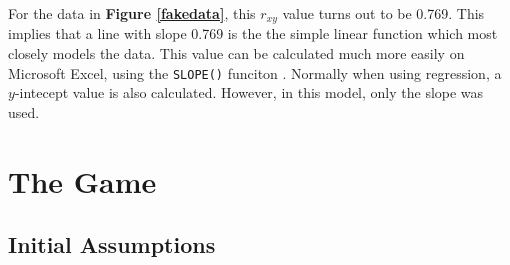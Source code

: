 \documentclass[11pt]{article}
\begin{document}
For the data in \textbf{Figure \ref{fakedata}}, this $r_{xy}$ value
turns out to be 0.769. This implies that a line with slope 0.769 is the
the simple linear function which most closely models the data. This
value can be calculated much more easily on Microsoft Excel, using the
\texttt{SLOPE()} funciton \cite{slope}. Normally when using regression,
a $y$-intecept value is also calculated. However, in this model, only
the slope was used.

\section{The Game}


\subsection{Initial Assumptions}
\end{document}
